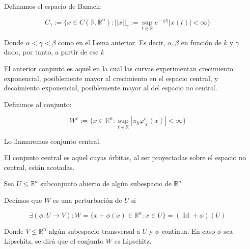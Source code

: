 \begin{defn}
	Definamos el espacio de Banach:
	
	\begin{equation*}
		C_\gamma := \{x \in C(\mathbb{R},\mathbb{R}^n): ||x||_\gamma:= \sup_{t \in \mathbb{R}}e^{-\gamma |t|}|x(t)|<\infty \}
	\end{equation*}
	
	Donde $\alpha < \gamma < \beta$ como en el Lema anterior. Es decir, $\alpha,\beta$ en función de $k$ y $\gamma$ dado, por tanto, a partir de ese $k$
\end{defn}

\begin{rmrk}
	El anterior conjunto es aquel en la cual las curvas experimentan crecimiento exponencial, posiblemente mayor al crecimiento en el espacio central, y decaímiento exponencial, posiblemente mayor al del espacio no central.
\end{rmrk}

\begin{defn}
	Definimos al conjunto:
	
	\begin{equation*}
		W^c:= \{ x \in \mathbb{R}^n: \sup_{t\in \mathbb{R}}|\pi_h \varphi^t_X(x)| < \infty \}
	\end{equation*}
	
	Lo llamaremos conjunto central.
\end{defn}

\begin{rmrk}
	El conjunto central es aquel cuyas órbitas, al ser proyectadas sobre el espacio no central, están acotadas.
\end{rmrk}



\begin{defn}
	Sea $U \leq  \mathbb{R}^n$ subconjunto abierto de algún subespacio de $\mathbb{R}^n$
	
	Decimos que $W$ es una perturbación de $U$ si
	
	\begin{equation*}
		\exists (\phi: U \to V) : W = \{x + \phi(x) \in \mathbb{R}^n : x \in U \} = (\operatorname{Id} + \phi)(U)
	\end{equation*}
	
	Donde $V \leq \mathbb{R}^n$ algún subespacio transversal a $U$ y $\phi$ continua. En caso $\phi$ sea Lipschitz, se dirá que el conjunto $W$ es Lipschitz.
\end{defn}

